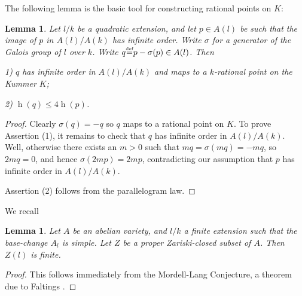 \documentclass[a4paper,12pt]{amsart}
\newtheorem{lemma}[definition]{Lemma}
\begin{document}
The following lemma is the basic tool for constructing rational points on $K$:
\begin{lemma}\label{lem:q}
Let ${l}/{k}$ be a quadratic extension, and let $p \in A({l}) $ be such that the image of $p$ in $A(l)/A(k)$ has infinite order. Write $\sigma$ for a generator of the Galois group of $l$ over $k$. Write $q {\stackrel{\text{\tiny def}}{=}} p - \sigma(p) \in A({l})$. Then

1) $q$ has infinite order in $A(l)/A(k)$ and maps to a ${k}$-rational point on the Kummer $K$;

2) ${\operatorname{h}}(q) \le 4{\operatorname{h}}(p)$. 
\end{lemma}
\begin{proof}
Clearly $\sigma(q) = -q$ so $q$ maps to a rational point on $K$. 
To prove Assertion (1), it remains to check that $q$ has infinite order in $A(l)/A({k})$. Well, otherwise there exists an $m>0$ such that $mq = \sigma(mq) = -mq$, so $2mq = 0$, and hence $\sigma(2mp)  = 2mp$, contradicting our assumption that $p$ has infinite order in $A(l)/A({k})$. 

Assertion (2) follows from the parallelogram law. 
\end{proof}

We recall
\begin{lemma}\label{lem:M-L}
Let $A$ be an abelian variety, and $l/k$ a finite extension such that the base-change $A_{l}$ is simple. Let $Z$ be a proper Zariski-closed subset of $A$. Then $Z(l)$ is finite. 
\end{lemma}
\begin{proof}
This follows immediately from the Mordell-Lang Conjecture, a theorem due to Faltings \cite{FaltingsMordellLang}.  
\end{proof}
\end{document}
